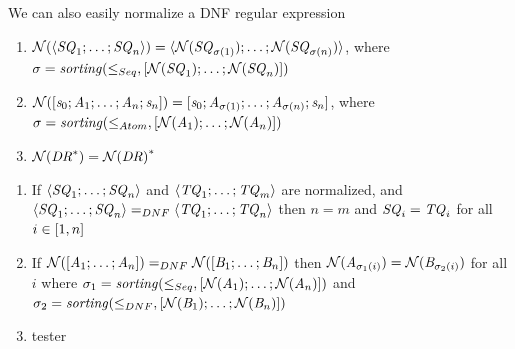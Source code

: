 \documentclass[numbers]{sigplanconf}
\begin{document}
We can also easily normalize a DNF regular expression

\begin{definition}
  \begin{enumerate}
  \item $\mathcal{N}(\langle\mathit{SQ}_1;\ldots;\mathit{SQ}_n\rangle) =
    \langle\mathcal{N}(\mathit{SQ}_{\sigma(1)});\ldots;\mathcal{N}(\mathit{SQ}_{\sigma(n)})\rangle$,
    where
    $\sigma=\mathit{sorting}(\leq_{Seq},[ \mathcal{N}(\mathit{SQ}_1);\ldots;\mathcal{N}(\mathit{SQ}_n) ])$
  \item $\mathcal{N}([\mathit{s}_0;\mathit{A}_1;\ldots;\mathit{A}_n;\mathit{s}_n]) =
    [\mathit{s}_0;\mathit{A}_{\sigma(1)};\ldots;\mathit{A}_{\sigma(n)};\mathit{s}_n]$,
    where
    $\sigma=\mathit{sorting}(\leq_{Atom},[ \mathcal{N}(\mathit{A}_1);\ldots;\mathcal{N}(\mathit{A}_n) ])$
  \item $\mathcal{N}({\mathit{DR}}^*)={\mathcal{N}(\mathit{DR})}^*$
  \end{enumerate}
\end{definition}

\begin{theorem}
  \begin{enumerate}
  \item
    If $\langle\mathit{SQ}_1;\ldots;\mathit{SQ}_n\rangle$ and
    $\langle\mathit{TQ}_1;\ldots;\mathit{TQ}_m\rangle$ are normalized, and
    $\langle\mathit{SQ}_1;\ldots;\mathit{SQ}_n\rangle=_{DNF}\langle\mathit{TQ}_1;\ldots;\mathit{TQ}_n\rangle$
    then
    $n=m$ and
    $\mathit{SQ}_i = \mathit{TQ}_i$ for all $i\in[1,n]$
  \item
    If $\mathcal{N}([\mathit{A}_1;\ldots;\mathit{A}_n]) =_{DNF}
    \mathcal{N}([\mathit{B}_1;\ldots;\mathit{B}_n])$ then
    $\mathcal{N}(\mathit{A}_{\sigma_1(i)}) =
    \mathcal{N}(\mathit{B}_{\sigma_2(i)})$ for all $i$
    where $\sigma_1 =
    \mathit{sorting}(\leq_{Seq},[ \mathcal{N}(\mathit{A}_1);\ldots;\mathcal{N}(\mathit{A}_n) ])$
    and $\sigma_2 =
    \mathit{sorting}(\leq_{DNF},[ \mathcal{N}(\mathit{B}_1);\ldots;\mathcal{N}(\mathit{B}_n) ])$
  \item
    tester
  \end{enumerate}
\end{theorem}
\end{document}
